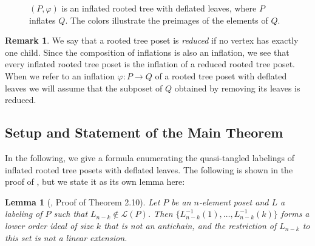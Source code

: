 \documentclass[11pt]{amsart}
\newtheorem{lemma}[thm]{Lemma}
\theoremstyle{definition}
\newtheorem{remark}[thm]{\textbf{Remark}}
\newcommand{\call}{\mathcal{L}}
\newcommand{\inverse}{^{-1}}
\newcommand{\vphi}{\varphi}
\begin{document}
\begin{figure}[h!]
{		}
	\caption{\label{fig:inflated rooted tree}$ (P,\vphi) $ is an inflated rooted tree with deflated leaves, where $ P $ inflates $ Q $. The colors illustrate the preimages of the elements of $ Q $. }
\end{figure}

\begin{remark}\label{reduced}
	We say that a rooted tree poset is \emph{reduced} if no vertex has exactly one child. Since the composition of inflations is also an inflation, we see that every inflated rooted tree poset is the inflation of a reduced rooted tree poset. When we refer to an inflation $ \vphi:P\to Q $ of a rooted tree poset with deflated leaves we will assume that the subposet of $ Q $ obtained by removing its leaves is reduced.
\end{remark}

\subsection{Setup and Statement of the Main Theorem}
In the following, we give a formula enumerating the quasi-tangled labelings of inflated rooted tree posets with deflated leaves. The following is shown in the proof of , but we state it as its own lemma here:
\begin{lemma}[\cite{DK20}, Proof of Theorem 2.10]\label{lower order ideal of size 3}
	Let $ P $ be an $ n $-element poset and $ L $ a labeling of $ P $ such that $ L_{n-k}\not\in\call(P) $. Then $ \{L_{n-k}\inverse(1),\ldots,L_{n-k}\inverse(k)\} $ forms a lower order ideal of size $ k $ that is not an antichain, and the restriction of $ L_{n-k} $ to this set is not a linear extension. %
\end{lemma}
\end{document}
